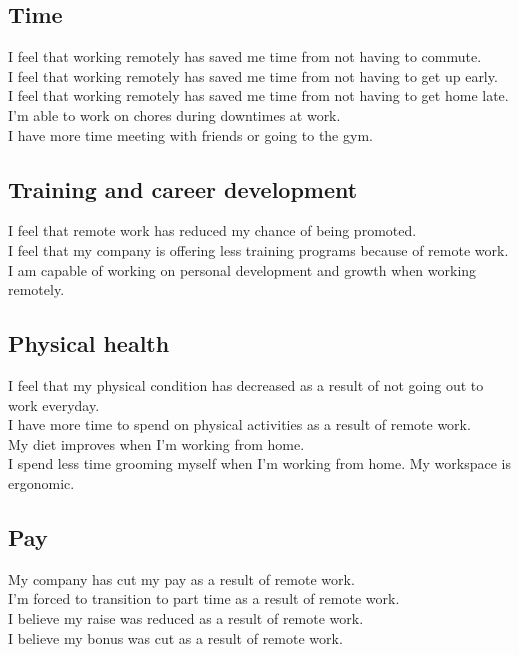 \documentclass[12pt]{article}
\begin{document}
\subsection*{Time} 

I feel that working remotely has saved me time from not having to commute. \\
I feel that working remotely has saved me time from not having to get up early. \\
I feel that working remotely has saved me time from not having to get home late. \\
I’m able to work on chores during downtimes at work.  \\
I have more time meeting with friends or going to the gym.

\subsection*{Training and career development}

I feel that remote work has reduced my chance of being promoted. \\
I feel that my company is offering less training programs because of remote work. \\
I am capable of working on personal development and growth when working remotely.


\subsection*{Physical health}

I feel that my physical condition has decreased as a result of not going out to work everyday.  \\
I have more time to spend on physical activities as a result of remote work. \\
My diet improves when I’m working from home.  \\
I spend less time grooming myself when I’m working from home.
My workspace is ergonomic. 

\subsection*{Pay}

My company has cut my pay as a result of remote work. \\
I’m forced to transition to part time as a result of remote work. \\
I believe my raise was reduced as a result of remote work. \\
I believe my bonus was cut as a result of remote work. 
\end{document}
